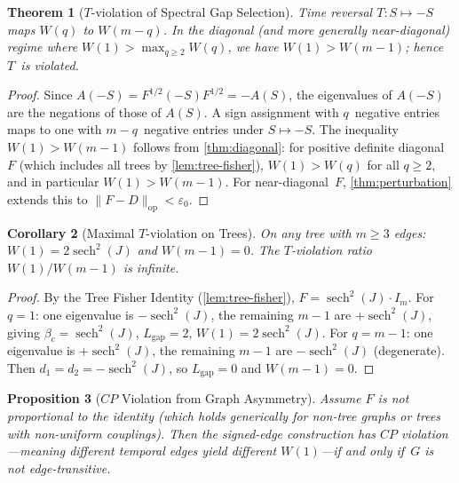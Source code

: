 \documentclass[11pt]{article}
\newtheorem{theorem}{Theorem}[section]
\newtheorem{proposition}[theorem]{Proposition}
\newtheorem{corollary}[theorem]{Corollary}
\theoremstyle{definition}
\theoremstyle{remark}
\begin{document}
\begin{theorem}[$T$-violation of Spectral Gap Selection]
\label{thm:T-violation}
Time reversal $T \colon S \mapsto -S$ maps $W(q)$ to $W(m - q)$.
In the diagonal (and more generally near-diagonal) regime where
$W(1) > \max_{q \geq 2} W(q)$, we have $W(1) > W(m-1)$; hence $T$~is violated.
\end{theorem}

\begin{proof}
Since $A(-S) = F^{1/2}(-S)F^{1/2} = -A(S)$, the eigenvalues of $A(-S)$
are the negations of those of $A(S)$. A sign assignment with $q$~negative
entries maps to one with $m - q$~negative entries under $S \mapsto -S$.
The inequality $W(1) > W(m-1)$ follows from \cref{thm:diagonal}: for
positive definite diagonal~$F$ (which includes all trees by
\cref{lem:tree-fisher}), $W(1) > W(q)$ for all $q \geq 2$,
and in particular $W(1) > W(m-1)$.
For near-diagonal~$F$, \cref{thm:perturbation} extends this to
$\|F - D\|_{\mathrm{op}} < \varepsilon_0$.
\end{proof}

\begin{corollary}[Maximal $T$-violation on Trees]
\label{cor:T-maximal}
On any tree with $m \geq 3$ edges: $W(1) = 2\operatorname{sech}^2(J)$
and $W(m-1) = 0$. The $T$-violation ratio $W(1)/W(m-1)$ is infinite.
\end{corollary}

\begin{proof}
By the Tree Fisher Identity (\cref{lem:tree-fisher}),
$F = \operatorname{sech}^2(J) \cdot I_m$. For $q = 1$: one eigenvalue
is $-\operatorname{sech}^2(J)$, the remaining $m - 1$ are
$+\operatorname{sech}^2(J)$, giving $\beta_c = \operatorname{sech}^2(J)$,
$L_{\mathrm{gap}} = 2$, $W(1) = 2\operatorname{sech}^2(J)$.
For $q = m-1$: one eigenvalue is $+\operatorname{sech}^2(J)$, the remaining
$m-1$ are $-\operatorname{sech}^2(J)$ (degenerate). Then $d_1 = d_2 =
-\operatorname{sech}^2(J)$, so $L_{\mathrm{gap}} = 0$ and $W(m-1) = 0$.
\end{proof}

\begin{proposition}[$CP$ Violation from Graph Asymmetry]
\label{prop:CP-violation}
Assume $F$ is not proportional to the identity (which holds generically
for non-tree graphs or trees with non-uniform couplings).
Then the signed-edge construction has $CP$ violation---meaning different
temporal edges yield different $W(1)$---if and only if~$G$ is not
edge-transitive.
\end{proposition}
\end{document}
